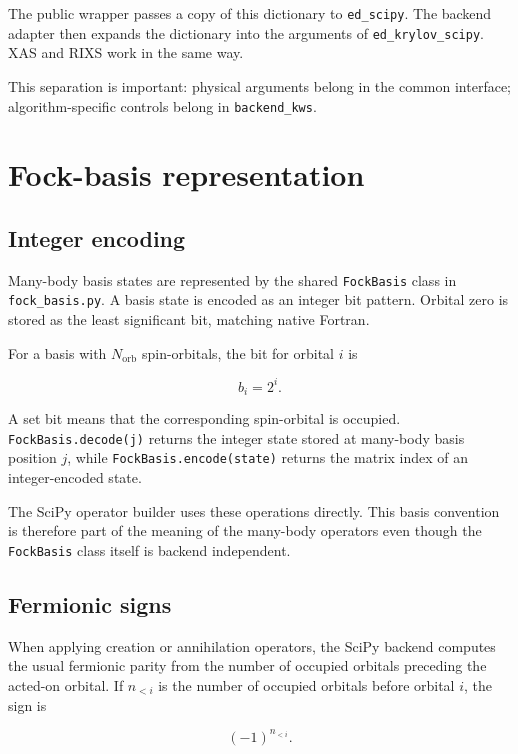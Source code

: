 \documentclass[11pt]{article}
\begin{document}
The public wrapper passes a copy of this dictionary to \texttt{ed\_scipy}.  The backend adapter then expands the dictionary into the arguments of \texttt{ed\_krylov\_scipy}.  XAS and RIXS work in the same way.

This separation is important: physical arguments belong in the common interface; algorithm-specific controls belong in \texttt{backend\_kws}.

\section{Fock-basis representation}

\subsection{Integer encoding}

Many-body basis states are represented by the shared \texttt{FockBasis} class in \texttt{fock\_basis.py}.  A basis state is encoded as an integer bit pattern.  Orbital zero is stored as the least significant bit, matching native Fortran.

For a basis with \(N_{\mathrm{orb}}\) spin-orbitals, the bit for orbital \(i\) is

\begin{equation}
  b_i = 2^i.
\end{equation}

A set bit means that the corresponding spin-orbital is occupied.  \texttt{FockBasis.decode(j)} returns the integer state stored at many-body basis position \(j\), while \texttt{FockBasis.encode(state)} returns the matrix index of an integer-encoded state.

The SciPy operator builder uses these operations directly.  This basis convention is therefore part of the meaning of the many-body operators even though the \texttt{FockBasis} class itself is backend independent.

\subsection{Fermionic signs}

When applying creation or annihilation operators, the SciPy backend computes the usual fermionic parity from the number of occupied orbitals preceding the acted-on orbital.  If \(n_{<i}\) is the number of occupied orbitals before orbital \(i\), the sign is

\begin{equation}
  (-1)^{n_{<i}}.
\end{equation}
\end{document}
